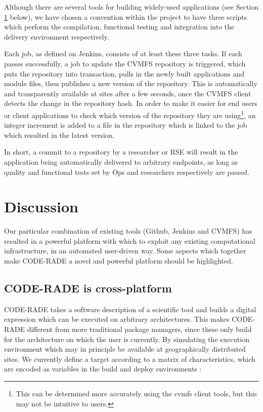 \documentclass[a4paper]{jpconf}
\begin{document}
    Although there are several tools for building widely-used applications (see Section
    \ref{Discussion} below), we have chosen a convention within the project to have three scripts
    which perform the compilation, functional testing and integration into the delivery environment
    respectively. 
    

Each job, as defined on Jenkins, consists of at least these three tasks. If each passes successfully,
a job to update the CVMFS repository is triggered, which puts the repository into transaction, pulls
in the newly built applications and module files, then publishes a new version of the repository.
This is automatically and transparently available at sites after a few seconds, once the CVMFS
client detects the change in the repository hash. In order to make it easier for end users or client
applications to check which version of the repository they are using\footnote{This can be determined
more accurately using the cvmfs client tools, but this may not be intuitive to users.}, an integer
increment is added to a file in the repository which is linked to the job which resulted in the
latest version.

In short, a commit to a repository by a researcher or RSE will result in the application being
automatically delivered to arbitrary endpoints, as long as quality and functional tests set by Ops
and researchers respectively are passed.

	\section{Discussion}\label{Discussion}

Our particular combination of existing tools (Github, Jenkins and CVMFS) has resulted in a powerful
platform with which to exploit any existing computational infrastructure, in an automated
user-driven way. Some aspects which together make CODE-RADE a novel and powerful platform should be
highlighted.

\subsection{CODE-RADE is cross-platform}

CODE-RADE takes a software description of a scientific tool and builds a digital expression which
can be executed on arbitrary architectures. This makes CODE-RADE different from more traditional
package managers, since these only build for the architecture on which the user is currently. By
simulating the execution environment which may in principle be available at geographically
distributed sites. We currently define a target according to a matrix of characteristics, which are
encoded as variables in the build and deploy environments :
\end{document}
